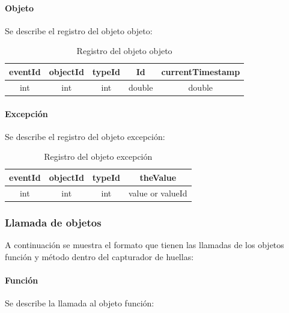 \documentclass[12pt,legalpaper]{report}
\begin{document}
				\paragraph{Objeto}

Se describe el registro del objeto objeto:
\newline

\begin{table}[!h]
\begin{center}
\begin{tabular}{| c | c | c | c | c |}
\hline
\rowcolor[gray]{0.9}eventId & objectId & typeId & Id & currentTimestamp\\
\hline
int & int & int & double & double\\
\hline
\end{tabular}
\caption{Registro del objeto objeto} 
\end{center}
\end{table}
				\paragraph{Excepción}

Se describe el registro del objeto excepción: \\

\begin{table}[!h]
\begin{center}
\begin{tabular}{| c | c | c | c |}
\hline
\rowcolor[gray]{0.9}eventId & objectId & typeId & theValue\\
\hline
int & int & int & value or valueId\footnotemark[1]\\
\hline
\end{tabular}
\caption{Registro del objeto excepción} 
\end{center}
\end{table}



			\subsubsection{Llamada de objetos}

A continuación se muestra el formato que tienen las llamadas de los objetos función y método dentro del capturador de huellas:\\

				\paragraph{Función}
Se describe la llamada al objeto función:\\
\end{document}
